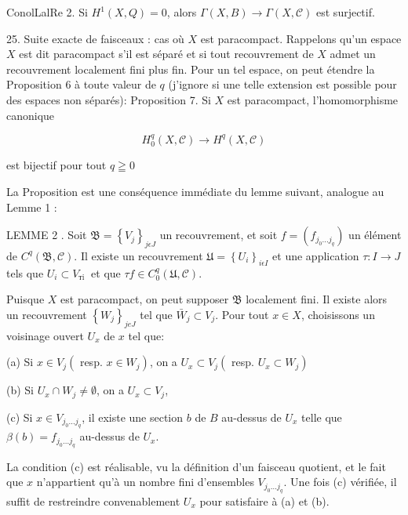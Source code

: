 ConolLalRe 2. Si $H^{1}(X, Q)=0$, alors $\Gamma(X, B) \rightarrow \Gamma(X, \mathcal{C})$ est surjectif.

25. Suite exacte de faisceaux : cas où $X$ est paracompact. Rappelons qu'un espace $X$ est dit paracompact s'il est séparé et si tout recouvrement de $X$ admet un recouvrement localement fini plus fin. Pour un tel espace, on peut étendre la Proposition 6 à toute valeur de $q$ (j'ignore si une telle extension est possible pour des espaces non séparés): Proposition 7. Si $X$ est paracompact, l'homomorphisme canonique

$$
H_{0}^{q}(X, \mathcal{C}) \rightarrow H^{q}(X, \mathcal{C})
$$

est bijectif pour tout $q \geqq 0$

La Proposition est une conséquence immédiate du lemme suivant, analogue au Lemme 1 :

LEMME 2 . Soit $\mathfrak{B}=\left\{V_{j}\right\}_{j \epsilon J}$ un recouvrement, et soit $f=\left(f_{j_{0} \ldots j_{q}}\right)$ un élément de $C^{q}(\mathfrak{B}, \mathcal{C}) .$ Il existe un recouvrement $\mathfrak{U}=\left\{U_{i}\right\}_{i \epsilon I}$ et une application $\tau: I \rightarrow J$ tels que $U_{i} \subset V_{\text {тi }}$ et que $\tau f \in C_{0}^{q}(\mathfrak{U}, \mathcal{C})$.

Puisque $X$ est paracompact, on peut supposer $\mathfrak{B}$ localement fini. Il existe alors un recouvrement $\left\{W_{j}\right\}_{j e J}$ tel que $\bar{W}_{j} \subset V_{j} .$ Pour tout $x \in X$, choisissons un voisinage ouvert $U_{x}$ de $x$ tel que:

(a) Si $x \in V_{j}\left(\right.$ resp. $\left.x \in W_{j}\right)$, on a $U_{x} \subset V_{j}\left(\right.$ resp. $\left.U_{x} \subset W_{j}\right)$

(b) Si $U_{x} \cap W_{j} \neq \emptyset$, on a $U_{x} \subset V_{j}$,

(c) Si $x \in V_{j_{0} \ldots j_{q}}$, il existe une section $b$ de $B$ au-dessus de $U_{x}$ telle que $\beta(b)=f_{j_{0} \ldots j_{q}}$ au-dessus de $U_{x}$.

La condition (c) est réalisable, vu la définition d'un faisceau quotient, et le fait que $x$ n'appartient qu'à un nombre fini d'ensembles $V_{j_{0} \ldots j_{q}} .$ Une fois (c) vérifiée, il suffit de restreindre convenablement $U_{x}$ pour satisfaire à (a) et (b).

